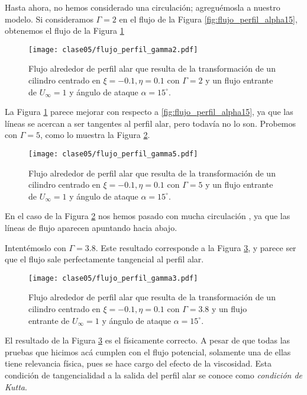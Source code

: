 Hasta ahora, no hemos considerado una circulación; agreguémosla a nuestro modelo.
Si consideramos $\Gamma=2$ en el flujo de la Figura \ref{fig:flujo_perfil_alpha15}, obtenemos el flujo de la Figura \ref{fig:flujo_perfil_gamma2}
%
\begin{figure}[h!]
\centering
\texttt{[image: clase05/flujo\_perfil\_gamma2.pdf]}
\caption{Flujo alrededor de perfil alar que resulta de la transformación de un cilindro centrado en $\xi=-0.1, \eta=0.1$ con $\Gamma=2$ y un flujo entrante de $U_\infty=1$ y ángulo de ataque $\alpha=15^\circ$.}\label{fig:flujo_perfil_gamma2}
\end{figure}

La Figura \ref{fig:flujo_perfil_gamma2} parece mejorar con respecto a \ref{fig:flujo_perfil_alpha15}, ya que las líneas se acercan a ser tangentes al perfil alar, pero todavía no lo son.
Probemos con $\Gamma=5$, como lo muestra la Figura \ref{fig:flujo_perfil_gamma5}.
%
\begin{figure}[h!]
\centering
\texttt{[image: clase05/flujo\_perfil\_gamma5.pdf]}
\caption{Flujo alrededor de perfil alar que resulta de la transformación de un cilindro centrado en $\xi=-0.1, \eta=0.1$ con $\Gamma=5$ y un flujo entrante de $U_\infty=1$ y ángulo de ataque $\alpha=15^\circ$.}\label{fig:flujo_perfil_gamma5}
\end{figure}

En el caso de la Figura \ref{fig:flujo_perfil_gamma5} nos hemos pasado con mucha circulación , ya que las líneas de flujo aparecen apuntando hacia abajo.

Intentémoslo con $\Gamma=3.8$.
Este resultado corresponde a la Figura \ref{fig:flujo_perfil_gamma3}, y parece ser que el flujo sale perfectamente tangencial al perfil alar.
%
\begin{figure}[h!]
\centering
\texttt{[image: clase05/flujo\_perfil\_gamma3.pdf]}
\caption{Flujo alrededor de perfil alar que resulta de la transformación de un cilindro centrado en $\xi=-0.1, \eta=0.1$ con $\Gamma=3.8$ y un flujo entrante de $U_\infty=1$ y ángulo de ataque $\alpha=15^\circ$.}\label{fig:flujo_perfil_gamma3}
\end{figure}

El resultado de la Figura \ref{fig:flujo_perfil_gamma3} es el físicamente correcto.
A pesar de que todas las pruebas que hicimos acá cumplen con el flujo potencial, solamente una de ellas tiene relevancia física, pues se hace cargo del efecto de la viscosidad.
Esta condición de tangencialidad a la salida del perfil alar se conoce como \emph{condición de Kutta}.

